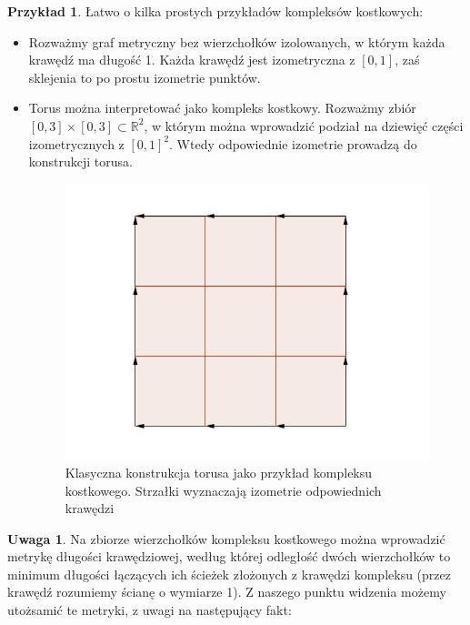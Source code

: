 \documentclass[licencjacka]{pracamgr}
\theoremstyle{definition}
\theoremstyle{definition}
\newtheorem{remark}{Uwaga}[section]
\theoremstyle{definition}
\theoremstyle{definition}
\newtheorem{example}{Przykład}[section]
\theoremstyle{definition}
\theoremstyle{plain}
\theoremstyle{plain}
\begin{document}
\begin{example}
	Łatwo o kilka prostych przykładów kompleksów kostkowych:
	\begin{itemize}
	\item Rozważmy graf metryczny bez wierzchołków izolowanych, w którym każda krawędź ma 
	długość 1. Każda krawędź jest izometryczna z $ [0,1] $, zaś sklejenia to
	po prostu izometrie punktów.
	\item Torus można interpretować jako kompleks kostkowy. Rozważmy zbiór 
	$ [0,3]\times[0,3] \subset \mathbb{R}^2 $, w którym można wprowadzić podział 
	na dziewięć części izometrycznych z $ [0,1]^2 $. Wtedy odpowiednie izometrie 
	prowadzą do konstrukcji torusa.
	\begin{figure}
	\caption{\small{Klasyczna konstrukcja torusa jako przykład kompleksu kostkowego. 
	Strzałki wyznaczają izometrie odpowiednich krawędzi}}
	\centering
	\includegraphics{torus}
	\end{figure}
	\end{itemize}
\end{example}


\begin{remark}
	Na zbiorze wierzchołków kompleksu kostkowego można wprowadzić metrykę 
	długości krawędziowej, według której 
	odległość dwóch wierzchołków to minimum długości łączących ich ścieżek złożonych 
	z krawędzi kompleksu (przez krawędź rozumiemy ścianę o wymiarze 1).
	Z naszego punktu widzenia możemy utożsamić te metryki, z uwagi na następujący fakt:
\end{remark}
\end{document}
